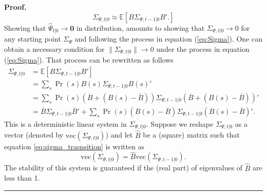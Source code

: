 \documentclass[thmsb,11pt]{article}
\newenvironment{proof}[1][Proof]{\noindent \textbf{#1.} }{\  \rule{0.5em}{0.5em}}
\begin{document}
\begin{proof}
	\begin{equation}
		\Sigma_{\Psi,t|0} \approx \mathbb{E}[B \Sigma_{\Psi,t-1|0} B'.] \label{eq:Sigma}
	\end{equation}  Showing that $\hat{\Psi}_{t|0} \rightarrow \bm 0$ in distribution, amounts to showing that $\Sigma_{\Psi,t|0}\rightarrow 0$ for any starting point $\Sigma_{\Psi}$ and following the process in equation (\ref{eq:Sigma}).  One can obtain a necessary condition for $\|\Sigma_{\Psi,t|0}\|\rightarrow 0$ under the process in equation (\ref{eq:Sigma}).
	That process can be rewritten as follows
	\begin{align}
		\Sigma_{\Psi,t|0} &= \mathbb{E}[B \Sigma_{\Psi,t-1|0} B']\\
				    &=\sum_s \Pr(s) B(s) \Sigma_{\Psi,t-1|0} B(s)'\\
				   &=\sum_s \Pr(s) (\overline B+(B(s)-\overline B))\Sigma_{\Psi,t-1|0}(\overline B+(B(s)-\overline B))'\\
				  &=\overline B \Sigma_{\Psi,t-1|0}\overline B' +\sum_s\Pr(s) (B(s)-\overline B)\Sigma_{\Psi,t-1|0}(B(s)-\overline B)'.\label{eq:sigma_trasnsition}
	\end{align}
% 	
 	This is a deterministic linear system in $\Sigma_{\Psi,t|0}$. Suppose we reshape $\Sigma_{\Psi,t|0}$  as a vector (denoted by $\text{vec}(\Sigma_{\Psi,t|0})$) and let $\hat{B}$ be a (square) matrix such that equation \ref{eq:sigma_trasnsition} is written as
% 	
 \[\text{vec}(\Sigma_{\Psi,t|0})=\hat{B}\text{vec}( \Sigma_{\Psi,t-1|0}).\]	
%
 The stability of this system is guaranteed if the (real part) of eigenvalues of $\hat{B}$ are less than 1.
 \end{proof}
\end{document}
